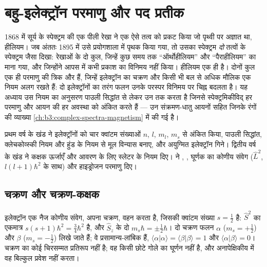 \chapter{बहु-इलेक्ट्रॉन परमाणु और पद प्रतीक}\label{ch:b3:many-electron-atoms}

1868 में सूर्य के स्पेक्ट्रम की एक पीली रेखा ने एक ऐसे तत्व को प्रकट किया जो
पृथ्वी पर अज्ञात था, हीलियम। जब अंततः 1895 में उसे प्रयोगशाला में पृथक किया गया,
तो उसका स्पेक्ट्रम \emph{दो} तत्वों के स्पेक्ट्रम जैसा दिखा: रेखाओं के दो कुल,
जिन्हें कुछ समय तक ``ऑर्थोहीलियम'' और ``पैराहीलियम'' का माना गया, और जिन्होंने
आपस में कभी प्रकाश का विनिमय नहीं किया। हीलियम एक ही है। दोनों कुल
एक ही परमाणु की त्रिक और  हैं, जिन्हें इलेक्ट्रॉन का चक्रण और किसी भी
बल से अधिक मौलिक एक नियम अलग रखते हैं: दो इलेक्ट्रॉनों का तरंग फलन उनके परस्पर
विनिमय पर चिह्न बदलता है। यह अध्याय उस नियम का अनुसरण पाउली सिद्धांत से लेकर
उन  तक करता है जिनसे स्पेक्ट्रमिकीविद् हर परमाणु और आयन की हर अवस्था
को अंकित करते हैं --- उन संक्रमण-धातु आयनों सहित जिनके रंगों की व्याख्या
\cref{ch:b3:complex-spectra-magnetism} में की गई है।

\begin{recall}
प्रथम वर्ष के खंड ने इलेक्ट्रॉनों को चार क्वांटम संख्याओं $n$, $l$,
$m_l$, $m_s$ से अंकित किया, पाउली सिद्धांत, क्लेचकोव्स्की नियम और हुंड के नियम
से मूल विन्यास बनाए, और अयुग्मित इलेक्ट्रॉन गिने। द्वितीय वर्ष के
खंड ने कक्षक ऊर्जाएँ और आवरण के लिए स्लेटर के नियम दिए।
 ने , ,
घूर्णक का कोणीय संवेग ($\hat L^2$,  $l(l+1)\hbar^2$ के साथ) और
हाइड्रोजन परमाणु दिए।
\end{recall}

\section{चक्रण और चक्रण-कक्षक}

इलेक्ट्रॉन एक नैज कोणीय संवेग, अपना चक्रण, वहन करता है, जिसकी क्वांटम
संख्या $s = \frac12$ है: $\hat S^2$ का एकमात्र  $s(s+1)\hbar^2 =
\frac34\hbar^2$ है, और $\hat S_z$ के दो  $m_s\hbar = \pm\frac12\hbar$।
दो चक्रण फलन $\alpha$ ($m_s = +\frac12$) और $\beta$
($m_s = -\frac12$) लिखे जाते हैं; वे प्रसामान्य-लांबिक हैं, $\langle\alpha|\alpha\rangle =
\langle\beta|\beta\rangle = 1$ और $\langle\alpha|\beta\rangle = 0$। चक्रण का कोई
चिरसम्मत प्रतिरूप नहीं है; वह किसी छोटे गोले का घूर्णन नहीं है, और
अनापेक्षिकीय  में वह बिल्कुल प्रवेश नहीं करता।

